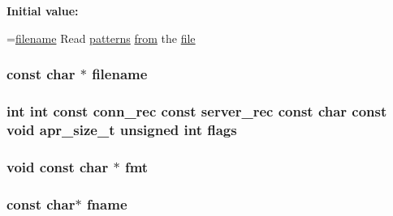 {\bfseries Initial value\+:}
\begin{DoxyCode}
=\hyperlink{group__APACHE__CORE__LOG_ga28849770c8bfeb04039d7dd29d4dfa35}{filename}
                 Read  \hyperlink{pcre_8txt_a926eab0066621d2f6fa733e6b1b636b7}{patterns}  \hyperlink{group__MOD__PROXY_ga900bb06a4314d99c8ad08d1ceffd114e}{from}  the  \hyperlink{group__APACHE__CORE__LOG_ga52f984475a42d9227fcbfd159db35676}{file}
\end{DoxyCode}
\subsubsection[{\texorpdfstring{filename}{filename}}]{\setlength{\rightskip}{0pt plus 5cm}const char $\ast$ filename}\hypertarget{group__APACHE__CORE__LOG_ga28849770c8bfeb04039d7dd29d4dfa35}{}\label{group__APACHE__CORE__LOG_ga28849770c8bfeb04039d7dd29d4dfa35}
\subsubsection[{\texorpdfstring{flags}{flags}}]{ {\bf int} {\bf int} const {\bf conn\+\_\+rec} const {\bf server\+\_\+rec} const char const {\bf void} {\bf apr\+\_\+size\+\_\+t} unsigned {\bf int} flags}\hypertarget{group__APACHE__CORE__LOG_ga7e4dc9555382e7e748f65f1bcf814367}{}\label{group__APACHE__CORE__LOG_ga7e4dc9555382e7e748f65f1bcf814367}
\subsubsection[{\texorpdfstring{fmt}{fmt}}]{ {\bf void} const char $\ast$ fmt}\hypertarget{group__APACHE__CORE__LOG_gaacca67646a119f459e8e6eecb7f5e7ac}{}\label{group__APACHE__CORE__LOG_gaacca67646a119f459e8e6eecb7f5e7ac}
\subsubsection[{\texorpdfstring{fname}{fname}}]{\setlength{\rightskip}{0pt plus 5cm}const char$\ast$ fname}\hypertarget{group__APACHE__CORE__LOG_ga6a2fc0c236288b07ce5bd1335ca89fa2}{}\label{group__APACHE__CORE__LOG_ga6a2fc0c236288b07ce5bd1335ca89fa2}
